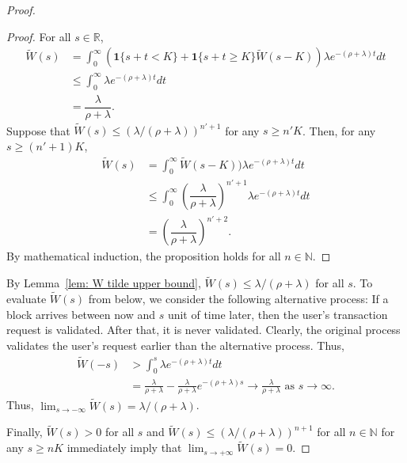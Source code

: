 \documentclass[12pt, letterpaper]{article}
\begin{document}
\begin{proof}
\begin{proof}
    For all $s \in \mathbb{R}$,
    \begin{align}
        \tilde{W}(s) & = \int_0^\infty (\textbf{1}\{s + t < K\} + \textbf{1}\{s + t \ge K\}\tilde{W}(s - K)) \lambda e^{-(\rho + \lambda)t}dt\\
        & \le \int_0^\infty \lambda e^{-(\rho + \lambda)t}dt\\
        & = \dfrac{\lambda}{\rho + \lambda}.
    \end{align}
    Suppose that $\tilde{W}(s) \le (\lambda/(\rho + \lambda))^{n' + 1}$ for any $s \ge n'K$. Then, for any $s \ge (n' + 1) K$,
    \begin{align}
        \tilde{W}(s) & = \int_0^\infty \tilde{W}(s - K)) \lambda e^{-(\rho + \lambda)t}dt\\
        & \le \int_0^\infty \left(\dfrac{\lambda}{\rho + \lambda}\right)^{n' + 1} \lambda e^{-(\rho + \lambda)t}dt\\
        & = \left(\dfrac{\lambda}{\rho + \lambda}\right)^{n' + 2}.
    \end{align}
    By mathematical induction, the proposition holds for all $n \in \mathbb{N}$.
\end{proof}

By Lemma~\ref{lem: W tilde upper bound}, $\tilde{W}(s) \le \lambda/(\rho + \lambda)$ for all $s$. To evaluate $\tilde{W}(s)$ from below, we consider the following alternative process: If a block arrives between now and $s$ unit of time later, then the user's transaction request is validated. After that, it is never validated. Clearly, the original process validates the user's request earlier than the alternative process. Thus,
\begin{align}
    \tilde{W}(-s) &> \int_0^s \lambda e^{-(\rho + \lambda) t}dt\\
    & = \frac{\lambda}{\rho + \lambda} - \frac{\lambda}{\rho + \lambda} e^{-(\rho + \lambda) s} \to \frac{\lambda}{\rho + \lambda} \text{ as } s \to \infty.
\end{align}
Thus, $\lim_{s \to - \infty}\tilde{W}(s) = \lambda/(\rho + \lambda)$.

Finally, $\tilde{W}(s) > 0$ for all $s$ and $\tilde{W}(s) \le (\lambda/(\rho + \lambda))^{n + 1}$ for all $n \in \mathbb{N}$ for any $s \ge nK$ immediately imply that $\lim_{s \to + \infty}\tilde{W}(s) = 0$.
\end{proof} %
\end{document}
